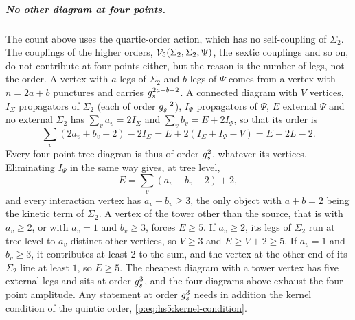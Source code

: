 \subparagraph{No other diagram at four points.}
The count above uses the quartic-order action, which has no self-coupling of $\Sigma_2$.
The couplings of the higher orders, $\mathcal{V}_{5}(\Sigma_2, \Sigma_2, \Psi)$, the sextic couplings and so on, do not contribute at four points either, but the reason is the number of legs, not the order.
A vertex with $a$ legs of $\Sigma_2$ and $b$ legs of $\Psi$ comes from a vertex with $n = 2 a + b$ punctures and carries $g_s^{2 a + b - 2}$.
A connected diagram with $V$ vertices, $I_\Sigma$ propagators of $\Sigma_2$ (each of order $g_s^{-2}$), $I_\Psi$ propagators of $\Psi$, $E$ external $\Psi$ and no external $\Sigma_2$ has $\sum_v a_v = 2 I_\Sigma$ and $\sum_v b_v = E + 2 I_\Psi$, so that its order is
\begin{equation}
  \sum_v (2 a_v + b_v - 2) - 2 I_\Sigma
    = E + 2 (I_\Sigma + I_\Psi - V)
    = E + 2 L - 2.
\end{equation}
Every four-point tree diagram is thus of order $g_s^2$, whatever its vertices.
Eliminating $I_\Psi$ in the same way gives, at tree level,
\begin{equation}
  E
    = \sum_v (a_v + b_v - 2) + 2,
\end{equation}
and every interaction vertex has $a_v + b_v \ge 3$, the only object with $a + b = 2$ being the kinetic term of $\Sigma_2$.
A vertex of the tower other than the source, that is with $a_v \ge 2$, or with $a_v = 1$ and $b_v \ge 3$, forces $E \ge 5$.
If $a_v \ge 2$, its legs of $\Sigma_2$ run at tree level to $a_v$ distinct other vertices, so $V \ge 3$ and $E \ge V + 2 \ge 5$.
If $a_v = 1$ and $b_v \ge 3$, it contributes at least $2$ to the sum, and the vertex at the other end of its $\Sigma_2$ line at least $1$, so $E \ge 5$.
The cheapest diagram with a tower vertex has five external legs and sits at order $g_s^3$, and the four diagrams above exhaust the four-point amplitude.
Any statement at order $g_s^3$ needs in addition the kernel condition of the quintic order, \eqref{p:eq:hs5:kernel-condition}.

